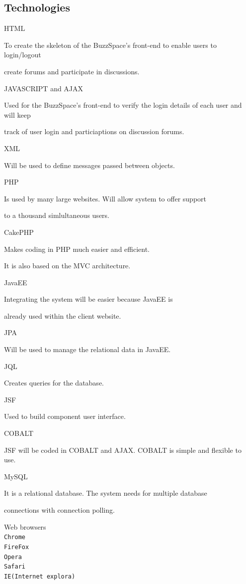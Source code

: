 \documentclass[a4paper,12pt]{report}
\begin{document}
\subsection{Technologies}
	\begin{description}
\item[$\bullet$] HTML
\item To create the skeleton of the BuzzSpace's front-end to enable users to login/logout
\item create forums and participate in discussions.
\item [$\bullet$] JAVASCRIPT and  AJAX
\item Used for the BuzzSpace's front-end to verify the login details of each user and will keep 
\item track of user login and particiaptions on discussion forums.
\item [$\bullet$] XML
\item Will be used to define messages passed between objects. 
\item [$\bullet$] PHP
\item Is used by many large websites. Will allow system to offer support
\item to a thousand simlultaneous users.
\item [$\bullet$] CakePHP
\item Makes coding in PHP much easier and efficient.
\item It is also based on the MVC architecture.
\item [$\bullet$] JavaEE
\item Integrating the system will be easier because JavaEE is
\item already used within the client website.
\item [$\bullet$] JPA
\item Will be used to manage the relational data in JavaEE.
\item [$\bullet$] JQL
\item Creates queries for the database.
\item [$\bullet$] JSF
\item Used to build component user interface.
\item [$\bullet$] COBALT
\item JSF will be coded in COBALT and AJAX. COBALT is simple and flexible to use.
\item [$\bullet$] MySQL
\item It is a relational database. The system needs for multiple database
\item connections with connection polling.
\item [$\bullet$] Web browsers\\
\texttt{Chrome}\\
\texttt{FireFox}\\
\texttt{Opera}\\
\texttt{Safari}\\
\texttt{IE(Internet explora)}
\end{description}
\end{document}
